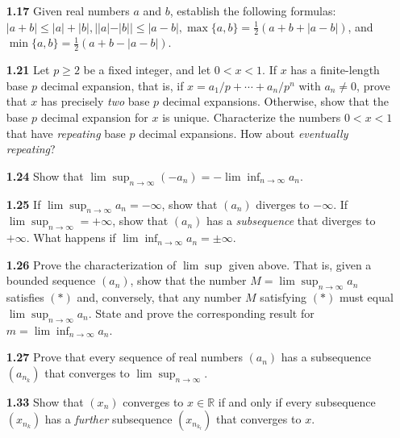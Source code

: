 \documentclass[12pt]{amsart}
\def\RR{{\mathbb R}}
\begin{document}
\begin{enumerate}
\bigskip

\item[\bf 1.17] Given real numbers $a$ and $b$, establish the following formulas: $|a+b|\leq |a|+|b|, ||a|-|b||\leq |a-b|, \max\{a,b\}=\frac12(a+b+|a-b|)$, and $\min\{a,b\}=\frac12(a+b-|a-b|)$.

\bigskip

\item[\bf 1.21] Let $p\geq 2$ be a fixed integer, and let $0<x<1.$ If $x$ has a finite-length base $p$ decimal expansion, that is, if $x=a_1/p+\cdots+a_n/p^n$ with $a_n\neq 0$, prove that $x$ has precisely \textit{two} base $p$ decimal expansions. Otherwise, show that the base $p$ decimal expansion for $x$ is unique. Characterize the numbers $0<x<1$ that have \textit{repeating} base $p$ decimal expansions. How about \textit{eventually repeating}? 

\bigskip

\item[\bf 1.24] Show that $\lim\sup_{n\to\infty}(-a_n)=-\lim\inf_{n\to\infty} a_n$.

\bigskip

\item[\bf 1.25] If $\lim\sup_{n\to\infty}a_n=-\infty$, show that $(a_n)$ diverges to $-\infty$. If $\lim\sup_{n\to\infty}=+\infty$, show that $(a_n)$ has a \textit{subsequence} that diverges to $+\infty$. What happens if $\lim\inf_{n\to\infty}a_n=\pm\infty$.

\bigskip

\item[\bf 1.26] Prove the characterization of $\lim\sup$ given above. That is, given a bounded sequence $(a_n)$, show that the number $M=\lim\sup_{n\to\infty}a_n$ satisfies $(*)$ and, conversely, that any number $M$ satisfying $(*)$ must equal $\lim\sup_{n\to\infty}a_n$. State and prove the corresponding result for $m=\lim\inf_{n\to\infty}a_n$.

\bigskip

\item[\bf 1.27] Prove that every sequence of real numbers $(a_n)$ has a subsequence $(a_{n_k})$ that converges to $\lim\sup_{n\to\infty}.$

\bigskip

\item[\bf 1.33] Show that $(x_n)$ converges to $x\in\RR$ if and only if every subsequence $(x_{n_k})$ has a \textit{further} subsequence $(x_{n_{k_l}})$ that converges to $x$. 

\bigskip


\end{enumerate}
\end{document}
